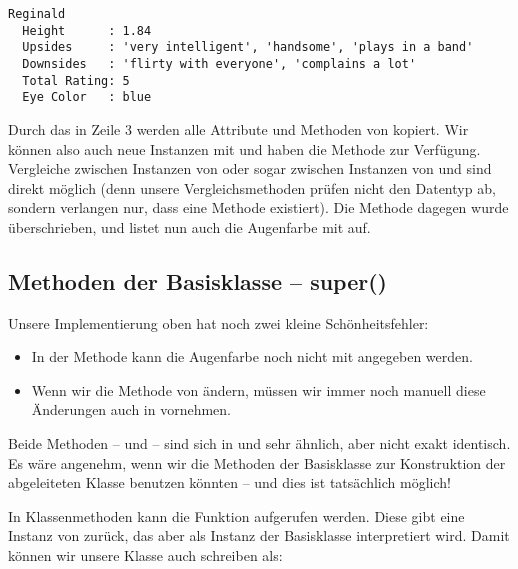 \begin{cmdbox}
\begin{verbatim}
Reginald
  Height      : 1.84
  Upsides     : 'very intelligent', 'handsome', 'plays in a band'
  Downsides   : 'flirty with everyone', 'complains a lot'
  Total Rating: 5
  Eye Color   : blue
\end{verbatim}
\end{cmdbox}

Durch das  in Zeile 3 werden alle Attribute und Methoden von  kopiert. Wir können also auch neue Instanzen mit  und haben die Methode  zur Verfügung. Vergleiche zwischen Instanzen von  oder sogar zwischen Instanzen von  und  sind direkt möglich (denn unsere Vergleichsmethoden prüfen nicht den Datentyp ab, sondern verlangen nur, dass eine Methode  existiert). Die Methode  dagegen wurde überschrieben, und listet nun auch die Augenfarbe mit auf.

\subsection{Methoden der Basisklasse -- super()}
Unsere Implementierung oben hat noch zwei kleine Schönheitsfehler:
\begin{itemize}
\item In der Methode  kann die Augenfarbe noch nicht mit angegeben werden.
\item Wenn wir die Methode  von  ändern, müssen wir immer noch manuell diese Änderungen auch in  vornehmen.
\end{itemize}
Beide Methoden --  und  -- sind sich in  und  sehr ähnlich, aber nicht exakt identisch. Es wäre angenehm, wenn wir die Methoden der Basisklasse zur Konstruktion der abgeleiteten Klasse benutzen könnten -- und dies ist tatsächlich möglich!

In Klassenmethoden kann die Funktion  aufgerufen werden. Diese gibt eine Instanz von  zurück, das aber als Instanz der Basisklasse interpretiert wird. Damit können wir unsere Klasse  auch schreiben als:

